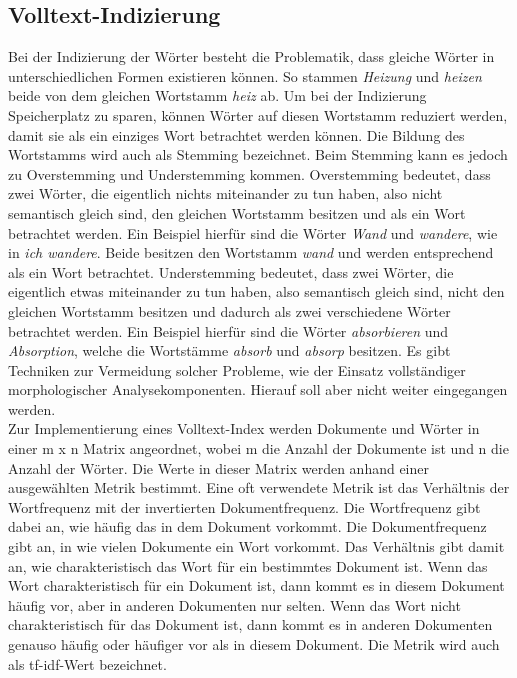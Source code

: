 \subsection{Volltext-Indizierung}
Bei der Indizierung der Wörter besteht die Problematik, dass gleiche Wörter in unterschiedlichen Formen existieren können.
So stammen \textit{Heizung} und \textit{heizen} beide von dem gleichen Wortstamm \textit{heiz} ab.
Um bei der Indizierung Speicherplatz zu sparen, können Wörter auf diesen Wortstamm reduziert werden, damit sie als ein einziges Wort betrachtet werden können.
Die Bildung des Wortstamms wird auch als Stemming bezeichnet.
Beim Stemming kann es jedoch zu Overstemming und Understemming kommen.
Overstemming bedeutet, dass zwei Wörter, die eigentlich nichts miteinander zu tun haben, also nicht semantisch gleich sind, den gleichen Wortstamm besitzen und als ein Wort betrachtet werden.
Ein Beispiel hierfür sind die Wörter \textit{Wand} und \textit{wandere}, wie in \textit{ich wandere}.
Beide besitzen den Wortstamm \textit{wand} und werden entsprechend als ein Wort betrachtet.
Understemming bedeutet, dass zwei Wörter, die eigentlich etwas miteinander zu tun haben, also semantisch gleich sind, nicht den gleichen Wortstamm besitzen und dadurch als zwei verschiedene Wörter betrachtet werden.
Ein Beispiel hierfür sind die Wörter \textit{absorbieren} und \textit{Absorption}, welche die Wortstämme \textit{absorb} und \textit{absorp} besitzen.
Es gibt Techniken zur Vermeidung solcher Probleme, wie der Einsatz vollständiger morphologischer Analysekomponenten.
Hierauf soll aber nicht weiter eingegangen werden.\\

Zur Implementierung eines Volltext-Index werden Dokumente und Wörter in einer m x n Matrix angeordnet, wobei m die Anzahl der Dokumente ist und n die Anzahl der Wörter.
Die Werte in dieser Matrix werden anhand einer ausgewählten Metrik bestimmt.
Eine oft verwendete Metrik ist das Verhältnis der Wortfrequenz mit der invertierten Dokumentfrequenz.
Die Wortfrequenz gibt dabei an, wie häufig das in dem Dokument vorkommt.
Die Dokumentfrequenz gibt an, in wie vielen Dokumente ein Wort vorkommt.
Das Verhältnis gibt damit an, wie charakteristisch das Wort für ein bestimmtes Dokument ist.
Wenn das Wort charakteristisch für ein Dokument ist, dann kommt es in diesem Dokument häufig vor, aber in anderen Dokumenten nur selten.
Wenn das Wort nicht charakteristisch für das Dokument ist, dann kommt es in anderen Dokumenten genauso häufig oder häufiger vor als in diesem Dokument.
Die Metrik wird auch als tf-idf-Wert bezeichnet.\\

